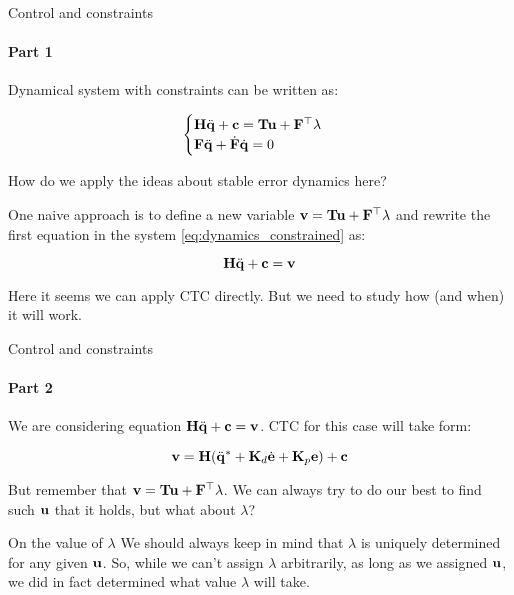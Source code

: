 \documentclass{beamer}
\begin{document}
\begin{frame}{Control and constraints}
\framesubtitle{Part 1}
\begin{flushleft}

Dynamical system with constraints can be written as:

\begin{equation}
\label{eq:dynamics_constrained}
\begin{cases}
    \mathbf{H} \ddot{\mathbf{q}} + \mathbf{c} = \mathbf{T}\mathbf{u} + \mathbf{F}^\top \lambda \\
    \mathbf{F} \ddot{\mathbf{q}} + \dot{\mathbf{F}} \dot{\mathbf{q}} = 0
\end{cases}
\end{equation}

How do we apply the ideas about stable error dynamics here?

\bigskip

One naive approach is to define a new variable $\mathbf{v} = \mathbf{T}\mathbf{u} + \mathbf{F}^\top \lambda$ and rewrite the first equation in the system \eqref{eq:dynamics_constrained} as:

\begin{equation}
\mathbf{H} \ddot{\mathbf{q}} + \mathbf{c} = \mathbf{v}
\end{equation}

Here it seems we can apply CTC directly. But we need to study how (and when) it will work.

\end{flushleft}
\end{frame}



\begin{frame}{Control and constraints}
\framesubtitle{Part 2}
\begin{flushleft}

We are considering equation $\mathbf{H} \ddot{\mathbf{q}} + \mathbf{c} = \mathbf{v}$. CTC for this case will take form:

\begin{equation}
\label{eq:CTC_constrained_1}
\mathbf{v} = \mathbf{H}(\ddot{\mathbf{q}}^* + \mathbf{K}_d\dot{\mathbf{e}} + \mathbf{K}_p\mathbf{e}) + \mathbf{c}
\end{equation}

But remember that $\mathbf{v} = \mathbf{T}\mathbf{u} + \mathbf{F}^\top \lambda$. We can always try to do our best to find such $\mathbf{u}$ that it holds, but what about $\lambda$?

\begin{block}{On the value of $\lambda$}
We should always keep in mind that $\lambda$ is uniquely determined for any given $\mathbf{u}$. So, while we can't assign $\lambda$ arbitrarily, as long as we assigned $\mathbf{u}$, we did in fact determined what value $\lambda$ will take.
\end{block}

\end{flushleft}
\end{frame}
\end{document}
